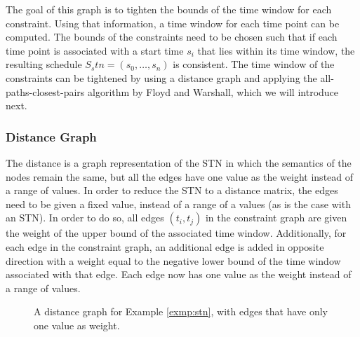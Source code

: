 \documentclass{article}
\theoremstyle{definition}
\begin{document}
The goal of this graph is to tighten the bounds of the time window for each constraint. Using that information, a time window for each time point can be computed. The bounds of the constraints need to be chosen such that if each time point is associated with a start time $s_i$ that lies within its time window, the resulting schedule $S_stn = (s_0,\dots, s_n)$ is consistent.
The time window of the constraints can be tightened by using a distance graph and applying the all-paths-closest-pairs algorithm by Floyd and Warshall, which we will introduce next.

\subsubsection{Distance Graph}
\label{text:distance_graph}
The distance is a graph representation of the STN in which the semantics of the nodes remain the same, but all the edges have one value as the weight instead of a range of values.
In order to reduce the STN to a distance matrix, the edges need to be given a fixed value, instead of a range of a values (as is the case with an STN). 
In order to do so, all edges $(t_i, t_j)$ in the constraint graph are given the weight of the upper bound of the associated time window. 
Additionally, for each edge in the constraint graph, an additional edge is added in opposite direction with a weight equal to the negative lower bound of the time window associated with that edge. 
Each edge now has one value as the weight instead of a range of values. 

\begin{figure}[h]
	\centering
	\caption{A distance graph for Example \ref{exmp:stn}, with edges that have only one value as weight.}
\end{figure}
\end{document}
